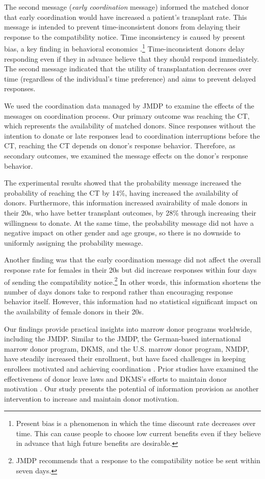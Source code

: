 \documentclass[12pt, a4paper]{article}
\begin{document}
The second message (\emph{early coordination} message) informed the matched donor that early coordination would have increased a patient's transplant rate. This message is intended to prevent time-inconsistent donors from delaying their response to the compatibility notice. Time inconsistency is caused by present bias, a key finding in behavioral economics \citep{Laibson1997, ODonoghue2001}.\footnote{Present bias is a phenomenon in which the time discount rate decreases over time. This can cause people to choose low current benefits even if they believe in advance that high future benefits are desirable.} Time-inconsistent donors delay responding even if they in advance believe that they should respond immediately. The second message indicated that the utility of transplantation decreases over time (regardless of the individual's time preference) and aims to prevent delayed responses.

We used the coordination data managed by JMDP to examine the effects of the messages on coordination process. Our primary outcome was reaching the CT, which represents the availability of matched donors. Since responses without the intention to donate or late responses lead to coordination interruptions before the CT, reaching the CT depends on donor's response behavior. Therefore, as secondary outcomes, we examined the message effects on the donor's response behavior.

The experimental results showed that the probability message increased the probability of reaching the CT by 14\%, having increased the availability of donors. Furthermore, this information increased avairability of male donors in their 20s, who have better transplant outcomes, by 28\% through increasing their willingness to donate. At the same time, the probability message did not have a negative impact on other gender and age groups, so there is no downside to uniformly assigning the probability message.

Another finding was that the early coordination message did not affect the overall response rate for females in their 20s but did increase responses within four days of sending the compatibility notice.\footnote{JMDP recommends that a response to the compatibility notice be sent within seven days.} In other words, this information shortens the number of days donors take to respond rather than encouraging response behavior itself. However, this information had no statistical significant impact on the availability of female donors in their 20s.

Our findings provide practical insights into marrow donor programs worldwide, including the JMDP. Similar to the JMDP, the German-based international marrow donor program, DKMS, and the U.S. marrow donor program, NMDP, have steadily increased their enrollment, but have faced challenges in keeping enrollees motivated and achieving coordination \citep{Switzer1999, Switzer2004, Haylock2024}. Prior studies have examined the effectiveness of donor leave laws \citep{Lacetera2014} and DKMS's efforts to maintain donor motivation \citep{Haylock2024}. Our study presents the potential of information provision as another intervention to increase and maintain donor motivation.
\end{document}
